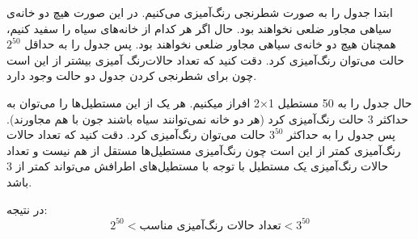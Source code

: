     ابتدا جدول را به صورت شطرنجی رنگ‌آمیزی می‌کنیم. در این صورت هیچ دو خانه‌ی سیاهی مجاور ضلعی نخواهند بود. حال اگر هر کدام از خانه‌های سیاه را سفید کنیم، همچنان هیچ دو خانه‌ی سیاهی مجاور ضلعی نخواهند بود. پس جدول را به حداقل $2^{50}$ حالت می‌توان رنگ‌آمیزی کرد. دقت کنید که تعداد حالات‌رنگ آمیزی بیشتر از این است چون برای شطرنجی کردن جدول دو حالت وجود دارد.

    حال جدول را به 50 مستطیل 1×2 افراز میکنیم. هر یک از این مستطیل‌ها را می‌توان به حداکثر 3 حالت رنگ‌آمیزی کرد (هر دو خانه نمی‌توانند سیاه باشند جون با هم مجاورند). پس جدول را به حداکثر $3^{50}$ حالت می‌توان رنگ‌آمیزی کرد. دقت کنید که تعداد حالات رنگ‌آمیزی کمتر از این است چون رنگ‌آمیزی مستطیل‌ها مستقل از هم نیست و تعداد حالات رنگ‌آمیزی یک مستطیل با توجه با مستطیل‌های اطرافش می‌تواند کمتر از 3 باشد.

    در نتیجه:
    $$2^{50} < \text{تعداد حالات رنگ‌آمیزی مناسب} < 3^{50}$$
